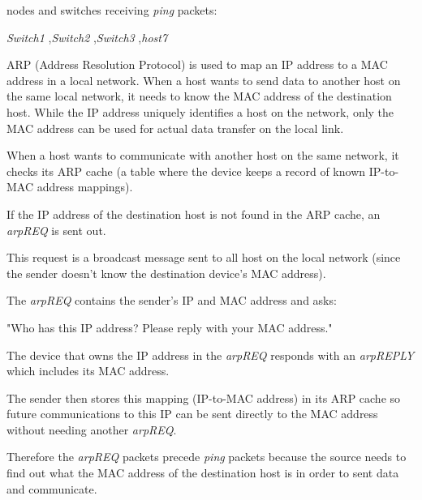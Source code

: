 \documentclass[a4paper]{article}
\begin{document}
	nodes and switches receiving \textit{ping} packets:
	\begin{center}
		\textit{Switch1} \qquad,\qquad \textit{Switch2} \qquad,\qquad \textit{Switch3} \qquad,\qquad \textit{host7}
	\end{center}
	
	\pagebreak
	
	ARP (Address Resolution Protocol) is used to map an IP address to a MAC address in a local network. When a host wants to send data to another host on the same local network, it needs to know the MAC address of the destination host. While the IP address uniquely identifies a host on the network, only the MAC address can be used for actual data transfer on the local link.
	
	When a host wants to communicate with another host on the same network, it checks its ARP cache (a table where the device keeps a record of known IP-to-MAC address mappings).
	
	If the IP address of the destination host is not found in the ARP cache, an \textit{arpREQ} is sent out.
	
	This request is a broadcast message sent to all host on the local network (since the sender doesn't know the destination device's MAC address).
	
	The \textit{arpREQ} contains the sender’s IP and MAC address and asks:
	\begin{center}
		"Who has this IP address? Please reply with your MAC address."
	\end{center}
	The device that owns the IP address in the \textit{arpREQ} responds with an \textit{arpREPLY} which includes its MAC address.
	
	The sender then stores this mapping (IP-to-MAC address) in its ARP cache so future communications to this IP can be sent directly to the MAC address without needing another \textit{arpREQ}.
	
	Therefore the \textit{arpREQ} packets precede \textit{ping} packets because the source needs to find out what the MAC address of the destination host is in order to sent data and communicate.
	
\end{document}
